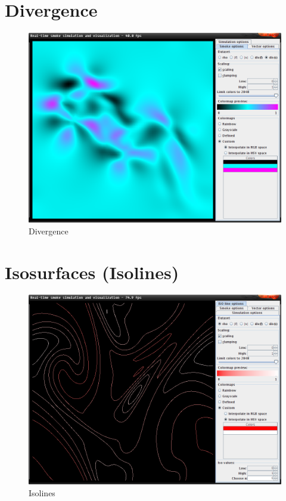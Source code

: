 \documentclass[a4paper,11pt,twoside]{report}
\begin{document}
	\section{Divergence}
		\begin{figure}[h]
		\centering
		\includegraphics[scale=\imagescalefactor]{images/step4.png}
		\caption{Divergence}\label{fig:step1}
		\end{figure}
		\newpage
	\section{Isosurfaces (Isolines)}
		\begin{figure}[h]
		\centering
		\includegraphics[scale=\imagescalefactor]{images/step5.png}
		\caption{Isolines}\label{fig:step1}
		\end{figure}
		\newpage
\end{document}

